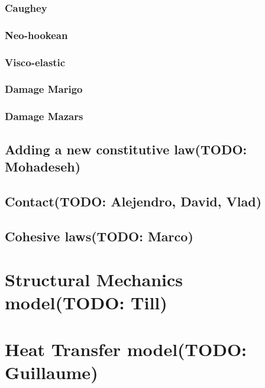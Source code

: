 \documentclass[a4paper,11pt]{book}
\newcommand{\todo}[1]{({\small\color{red}\textbf{TODO: }\textbf{#1}})}
\begin{document}
\subsubsection{Caughey}
\subsubsection{Neo-hookean}
\subsubsection{Visco-elastic}
\subsubsection{Damage Marigo}
\subsubsection{Damage Mazars}

\subsection{Adding a new constitutive law\todo{Mohadeseh}}

\subsection{Contact\todo{Alejendro, David, Vlad}}

\subsection{Cohesive laws\todo{Marco}}


\section{Structural Mechanics model\todo{Till}}

\section{Heat Transfer model\todo{Guillaume}}

\end{document}
